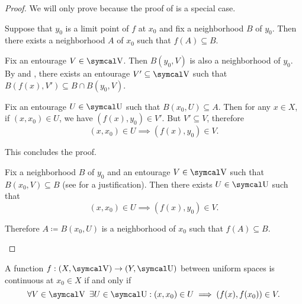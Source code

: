 \begin{proof}
  We will only prove  because the proof of  is a special case.

  \begin{description}
    \Implies Suppose that \( y_0 \) is a limit point of \( f \) at \( x_0 \) and fix a neighborhood \( B \) of \( y_0 \). Then there exists a neighborhood \( A \) of \( x_0 \) such that \( f(A) \subseteq B \).

    Fix an entourage \( V \in \CV \). Then \( B(y_0, V) \) is also a neighborhood of \( y_0 \). By  and , there exists an entourage \( V' \subseteq \CV \) such that \( B(f(x), V') \subseteq B \cap B(y_0, V) \).

    Fix an entourage \( U \in \CU \) such that \( B(x_0, U) \subseteq A \). Then for any \( x \in X \), if \( (x, x_0) \in U \), we have \( (f(x), y_0) \in V' \). But \( V' \subseteq V \), therefore
    \begin{equation*}
      (x, x_0) \in U \implies (f(x), y_0) \in V.
    \end{equation*}

    This concludes the proof.

    \ImpliedBy Fix a neighborhood \( B \) of \( y_0 \) and an entourage \( V \in \CV \) such that \( B(x_0, V) \subseteq B \) (see  for a justification). Then there exists \( U \in \CU \) such that
    \begin{equation*}
      (x, x_0) \in U \implies (f(x), y_0) \in V.
    \end{equation*}

    Therefore \( A \coloneqq B(x_0, U) \) is a neighborhood of \( x_0 \) such that \( f(A) \subseteq B \).
  \end{description}
\end{proof}

\begin{corollary}\label{thm:uniform_space_local_continuity}
  A function \( f: (X, \CV) \to (Y, \CU) \) between uniform spaces is continuous at \( x_0 \in X \) if and only if
  \begin{equation*}
    \forall V \in \CV \ \exists U \in \CU : (x, x_0) \in U \implies (f(x), f(x_0)) \in V.
  \end{equation*}
\end{corollary}

